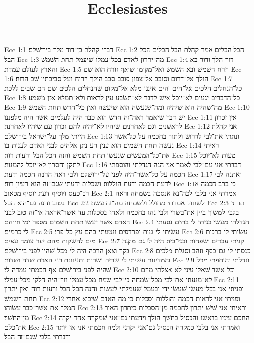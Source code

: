 

\title{Ecclesiastes}

Ecc 1:1  דברי קהלת בן־דוד מלך בירושׁלם׃
Ecc 1:2  הבל הבלים אמר קהלת הבל הבלים הכל הבל׃
Ecc 1:3  מה־יתרון לאדם בכל־עמלו שׁיעמל תחת השׁמשׁ׃
Ecc 1:4  דור הלך ודור בא והארץ לעולם עמדת׃
Ecc 1:5  וזרח השׁמשׁ ובא השׁמשׁ ואל־מקומו שׁואף זורח הוא שׁם׃
Ecc 1:6  הולך אל־דרום וסובב אל־צפון סובב סבב הולך הרוח ועל־סביבתיו שׁב הרוח׃
Ecc 1:7  כל־הנחלים הלכים אל־הים והים איננו מלא אל־מקום שׁהנחלים הלכים שׁם הם שׁבים ללכת׃
Ecc 1:8  כל־הדברים יגעים לא־יוכל אישׁ לדבר לא־תשׂבע עין לראות ולא־תמלא אזן משׁמע׃
Ecc 1:9  מה־שׁהיה הוא שׁיהיה ומה־שׁנעשׂה הוא שׁיעשׂה ואין כל־חדשׁ תחת השׁמשׁ׃
Ecc 1:10  ישׁ דבר שׁיאמר ראה־זה חדשׁ הוא כבר היה לעלמים אשׁר היה מלפננו׃
Ecc 1:11  אין זכרון לראשׁנים וגם לאחרנים שׁיהיו לא־יהיה להם זכרון עם שׁיהיו לאחרנה׃
Ecc 1:12  אני קהלת הייתי מלך על־ישׂראל בירושׁלם׃
Ecc 1:13  ונתתי את־לבי לדרושׁ ולתור בחכמה על כל־אשׁר נעשׂה תחת השׁמים הוא ענין רע נתן אלהים לבני האדם לענות בו׃
Ecc 1:14  ראיתי את־כל־המעשׂים שׁנעשׂו תחת השׁמשׁ והנה הכל הבל ורעות רוח׃
Ecc 1:15  מעות לא־יוכל לתקן וחסרון לא־יוכל להמנות׃
Ecc 1:16  דברתי אני עם־לבי לאמר אני הנה הגדלתי והוספתי חכמה על כל־אשׁר־היה לפני על־ירושׁלם ולבי ראה הרבה חכמה ודעת׃
Ecc 1:17  ואתנה לבי לדעת חכמה ודעת הוללות ושׂכלות ידעתי שׁגם־זה הוא רעיון רוח׃
Ecc 1:18  כי ברב חכמה רב־כעס ויוסיף דעת יוסיף מכאוב׃
Ecc 2:1  אמרתי אני בלבי לכה־נא אנסכה בשׂמחה וראה בטוב והנה גם־הוא הבל׃
Ecc 2:2  לשׂחוק אמרתי מהולל ולשׂמחה מה־זה עשׂה׃
Ecc 2:3  תרתי בלבי למשׁוך ביין את־בשׂרי ולבי נהג בחכמה ולאחז בסכלות עד אשׁר־אראה אי־זה טוב לבני האדם אשׁר יעשׂו תחת השׁמים מספר ימי חייהם׃
Ecc 2:4  הגדלתי מעשׂי בניתי לי בתים נטעתי לי כרמים׃
Ecc 2:5  עשׂיתי לי גנות ופרדסים ונטעתי בהם עץ כל־פרי׃
Ecc 2:6  עשׂיתי לי ברכות מים להשׁקות מהם יער צומח עצים׃
Ecc 2:7  קניתי עבדים ושׁפחות ובני־בית היה לי גם מקנה בקר וצאן הרבה היה לי מכל שׁהיו לפני בירושׁלם׃
Ecc 2:8  כנסתי לי גם־כסף וזהב וסגלת מלכים והמדינות עשׂיתי לי שׁרים ושׁרות ותענוגת בני האדם שׁדה ושׁדות׃
Ecc 2:9  וגדלתי והוספתי מכל שׁהיה לפני בירושׁלם אף חכמתי עמדה לי׃
Ecc 2:10  וכל אשׁר שׁאלו עיני לא אצלתי מהם לא־מנעתי את־לבי מכל־שׂמחה כי־לבי שׂמח מכל־עמלי וזה־היה חלקי מכל־עמלי׃
Ecc 2:11  ופניתי אני בכל־מעשׂי שׁעשׂו ידי ובעמל שׁעמלתי לעשׂות והנה הכל הבל ורעות רוח ואין יתרון תחת השׁמשׁ׃
Ecc 2:12  ופניתי אני לראות חכמה והוללות וסכלות כי מה האדם שׁיבוא אחרי המלך את אשׁר־כבר עשׂוהו׃
Ecc 2:13  וראיתי אני שׁישׁ יתרון לחכמה מן־הסכלות כיתרון האור מן־החשׁך׃
Ecc 2:14  החכם עיניו בראשׁו והכסיל בחשׁך הולך וידעתי גם־אני שׁמקרה אחד יקרה את־כלם׃
Ecc 2:15  ואמרתי אני בלבי כמקרה הכסיל גם־אני יקרני ולמה חכמתי אני אז יותר ודברתי בלבי שׁגם־זה הבל׃
